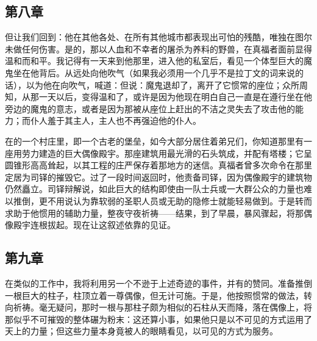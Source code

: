 
\subsection{第八章}

但让我们回到：他在其他各处、在所有其他城市都表现出可怕的残酷，唯独在图尔未做任何伤害。是的，那以人血和不幸者的屠杀为养料的野兽，在真福者面前显得温和而和平。我记得有一天来到他那里，进入他的私室后，看见一个体型巨大的魔鬼坐在他背后。从远处向他吹气（如果我必须用一个几乎不是拉丁文的词来说的话），以为他在向吹气，喊道：但说：魔鬼退却了，离开了它惯常的座位；众所周知，从那一天以后，变得温和了，或许是因为他现在明白自己一直是在遵行坐在他旁边的魔鬼的意志，或者是因为那被从座位上赶出的不洁之灵失去了攻击他的能力；而仆人羞于其主人，主人也不再强迫他的仆人。\par

在的一个村庄里，即一个古老的堡垒，如今大部分居住着弟兄们，你知道那里有一座用劳力建造的巨大偶像殿宇。那座建筑用最光滑的石头筑成，并配有塔楼；它呈圆锥形高高耸起，以其工程的庄严保存着那地方的迷信。真福者曾多次命令在那里定居为司铎的摧毁它。过了一段时间返回时，他责备司铎，因为偶像殿宇的建筑物仍然矗立。司铎辩解说，如此巨大的结构即使由一队士兵或一大群公众的力量也难以推倒，更不用说认为靠软弱的圣职人员或无助的隐修士就能轻易做到。于是转而求助于他惯用的辅助力量，整夜守夜祈祷——结果，到了早晨，暴风骤起，将那偶像殿宇连根拔起。现在让这叙述依靠的见证。\par


\subsection{第九章}

在类似的工作中，我将利用另一个不逊于上述奇迹的事件，并有的赞同。准备推倒一根巨大的柱子，柱顶立着一尊偶像，但无计可施。于是，他按照惯常的做法，转向祈祷。毫无疑问，那时一根与那柱子颇为相似的石柱从天而降，落在偶像上，将那似乎不可摧毁的整体碾为粉末：这还算小事，如果他只是以不可见的方式运用了天上的力量；但这些力量本身竟被人的眼睛看见，以可见的方式为服务。\par


